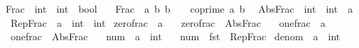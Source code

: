 \begin{isabellebody}
\endisatagproof
{\isafoldproof}%
%
\isadelimproof
\isanewline
%
\endisadelimproof
\isanewline
{}\isamarkupfalse%
\ Frac\ {\isacharcolon}{\kern0pt}{\isacharcolon}{\kern0pt}\ {\isachardoublequoteopen}int\ {\isasymtimes}\ int\ {\isasymRightarrow}\ bool{\isachardoublequoteclose}\ \isanewline
\ \ {\isachardoublequoteopen}Frac\ {\isasymequiv}\ {\isasymlambda}{\isacharparenleft}{\kern0pt}a{\isacharcomma}{\kern0pt}\ b{\isacharparenright}{\kern0pt}{\isachardot}{\kern0pt}\ b\ {\isachargreater}{\kern0pt}\ {}\ {\isasymand}\ coprime\ a\ b{\isachardoublequoteclose}\isanewline
\isanewline
{}\isamarkupfalse%
\isanewline
\ \ Abs{\isacharunderscore}{\kern0pt}Frac\ {\isacharcolon}{\kern0pt}{\isacharcolon}{\kern0pt}\ {\isachardoublequoteopen}int\ {\isasymtimes}\ int\ {\isasymRightarrow}\ {\isacharprime}{\kern0pt}a{\isachardoublequoteclose}\isanewline
\ \ Rep{\isacharunderscore}{\kern0pt}Frac\ {\isacharcolon}{\kern0pt}{\isacharcolon}{\kern0pt}\ {\isachardoublequoteopen}{\isacharprime}{\kern0pt}a\ {\isasymRightarrow}\ int\ {\isasymtimes}\ int{\isachardoublequoteclose}\isanewline
\isanewline
{}\isamarkupfalse%
\ zero{\isacharunderscore}{\kern0pt}frac\ {\isacharcolon}{\kern0pt}{\isacharcolon}{\kern0pt}\ {\isacharprime}{\kern0pt}a\ \isanewline
\ \ {\isachardoublequoteopen}zero{\isacharunderscore}{\kern0pt}frac\ {\isasymequiv}\ Abs{\isacharunderscore}{\kern0pt}Frac\ {\isacharparenleft}{\kern0pt}{}{\isacharcomma}{\kern0pt}\ {}{\isacharparenright}{\kern0pt}{\isachardoublequoteclose}\isanewline
\isanewline
{}\isamarkupfalse%
\ one{\isacharunderscore}{\kern0pt}frac\ {\isacharcolon}{\kern0pt}{\isacharcolon}{\kern0pt}\ {\isacharprime}{\kern0pt}a\ \isanewline
\ \ {\isachardoublequoteopen}one{\isacharunderscore}{\kern0pt}frac\ {\isasymequiv}\ Abs{\isacharunderscore}{\kern0pt}Frac\ {\isacharparenleft}{\kern0pt}{}{\isacharcomma}{\kern0pt}\ {}{\isacharparenright}{\kern0pt}{\isachardoublequoteclose}\isanewline
\isanewline
{}\isamarkupfalse%
\ num\ {\isacharcolon}{\kern0pt}{\isacharcolon}{\kern0pt}\ {\isachardoublequoteopen}{\isacharprime}{\kern0pt}a\ {\isasymRightarrow}\ int{\isachardoublequoteclose}\ \isanewline
\ \ {\isachardoublequoteopen}num\ {\isasymequiv}\ fst\ {\isasymcirc}\ Rep{\isacharunderscore}{\kern0pt}Frac{\isachardoublequoteclose}\isanewline
\isanewline
{}\isamarkupfalse%
\ denom\ {\isacharcolon}{\kern0pt}{\isacharcolon}{\kern0pt}\ {\isachardoublequoteopen}{\isacharprime}{\kern0pt}a\ {\isasymRightarrow}\ int{\isachardoublequoteclose}\ \isanewline

\end{isabellebody}
